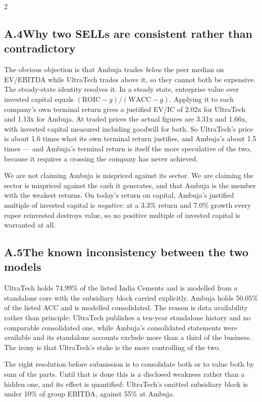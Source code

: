 \begin{paracol}{2}
\switchcolumn*
\subsection*{A.4\quad Why two SELLs are consistent rather than contradictory}

The obvious objection is that Ambuja trades \emph{below} the peer median on EV/EBITDA
while UltraTech trades above it, so they cannot both be expensive. The steady-state
identity resolves it. In a steady state, enterprise value over invested capital equals
$(\text{ROIC}-g)/(\text{WACC}-g)$. Applying it to each company's own terminal return
gives a justified EV/IC of 2.02x for UltraTech and 1.13x for Ambuja. At traded prices
the actual figures are 3.31x and 1.66x, with invested capital measured including
goodwill for both. So UltraTech's price is about 1.6 times what its own terminal
return justifies, and Ambuja's about 1.5 times — and Ambuja's terminal return is
itself the more speculative of the two, because it requires a crossing the company has
never achieved.

\begin{keybox}
We are not claiming Ambuja is mispriced against its sector. We are claiming the sector
is mispriced against the cash it generates, and that Ambuja is the member with the
weakest returns. On today's return on capital, Ambuja's justified multiple of invested
capital is \emph{negative}: at a 3.3\% return and 7.0\% growth every rupee reinvested
destroys value, so no positive multiple of invested capital is warranted at all.
\end{keybox}

\subsection*{A.5\quad The known inconsistency between the two models}

UltraTech holds 74.99\% of the listed India Cements and is modelled from a standalone
core with the subsidiary block carried explicitly. Ambuja holds 50.05\% of the listed
ACC and is modelled consolidated. The reason is data availability rather than
principle: UltraTech publishes a ten-year standalone history and no comparable
consolidated one, while Ambuja's consolidated statements were available and its
standalone accounts exclude more than a third of the business. The irony is that
UltraTech's stake is the more controlling of the two.

The right resolution before submission is to consolidate both or to value both by sum
of the parts. Until that is done this is a disclosed weakness rather than a hidden one,
and its effect is quantified: UltraTech's omitted subsidiary block is under 10\% of
group EBITDA, against 55\% at Ambuja.


\end{paracol}
